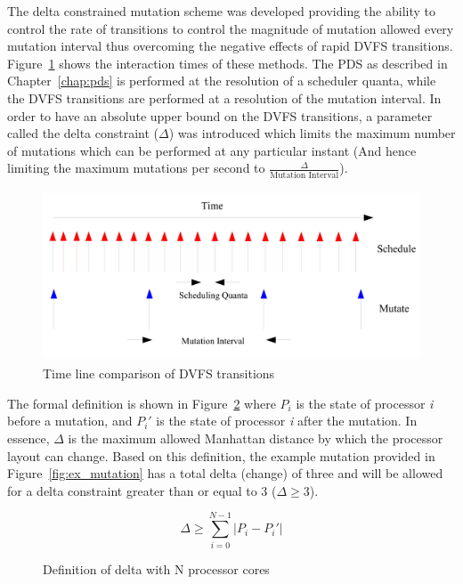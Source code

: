 The delta constrained mutation scheme was developed providing the ability to control the rate of transitions
to control the magnitude of mutation allowed every mutation interval thus overcoming the negative effects
of rapid DVFS transitions. Figure~\ref{fig:schedule_mutate} shows the interaction times of these methods. 
The PDS as described in Chapter~\ref{chap:pds} is performed at the resolution of a scheduler quanta, while
the DVFS transitions are performed at a resolution of the mutation interval. In order to have an absolute
upper bound on the DVFS transitions, a parameter called the delta constraint ($\Delta$) was introduced
which limits the maximum number of mutations which can be performed at any particular instant (And hence
limiting the maximum mutations per second to $\frac{\Delta}{\text{Mutation Interval}}$). 

\begin{figure}[h!]
  \begin{center}
    \includegraphics[height=2in]{figures/Schedule_Mutate.jpg}%
    \caption{Time line comparison of DVFS transitions}
    \label{fig:schedule_mutate}
  \end{center}
\end{figure}


The formal definition is shown in Figure~\ref{fig:Delta_def} where $P_{i}$ is the state of processor \textit{i} 
before a mutation, and $P_{i}'$ is the state of processor \textit{i} after the mutation.
In essence, $\Delta$ is the maximum allowed Manhattan distance by which the processor layout can change. 
Based on this definition, the example mutation provided in Figure~\ref{fig:ex_mutation} has 
a total delta (change) of three and will be allowed for a delta constraint greater than
or equal to 3 ($\Delta \geq 3$).

\begin{figure}[h!]
\centering
\begin{equation*}
    \Delta \geq \displaystyle\sum_{i=0}^{N-1} {| P_{i} - P_{i}' |}
\end{equation*}
\caption{Definition of delta with N processor cores}
\label{fig:Delta_def}
\end{figure}

